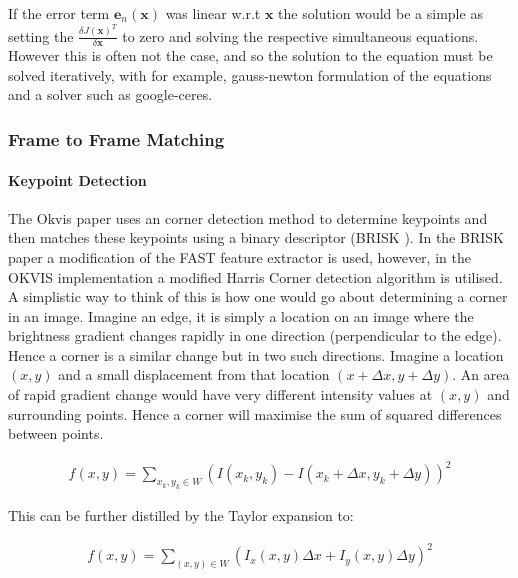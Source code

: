\documentclass[a4paper,11pt,notitlepage]{article}
\begin{document}
If the error term $\mathbf{e}_{n}(\mathbf{x})$ was linear w.r.t $\mathbf{x}$ the solution would be a simple as setting the $\frac{\delta J(\mathbf{x})^{T}}{\delta \mathbf{x}}$ to zero and solving the respective simultaneous equations. However this is often not the case, and so the solution to the equation must be solved iteratively, with for example, gauss-newton formulation of the equations and a solver such as google-ceres.

\subsubsection{Frame to Frame Matching}\label{BRISK_section}

\paragraph{Keypoint Detection}

The Okvis \cite{Okvis_1} paper uses an corner detection method to determine keypoints and then matches these keypoints using a binary descriptor (BRISK \cite{BRISK}). In the BRISK paper a modification of the FAST feature extractor is used, however, in the OKVIS implementation a modified Harris Corner detection algorithm is utilised. A simplistic way to think of this is how one would go about determining a corner in an image. Imagine an edge, it is simply a location on an image where the brightness gradient changes rapidly in one direction (perpendicular to the edge). Hence a corner is a similar change but in two such directions. Imagine a location $(x,y)$ and a small displacement from that location $(x+ \Delta x, y + \Delta y)$. An area of rapid gradient change would have very different intensity values at $(x,y)$ and surrounding points. Hence a corner will maximise the sum of squared differences between points.

\begin{equation}
\begin{aligned}
f(x,y) = \sum_{x_{k},y_{k} \in W} (I(x_{k},y_{k}) - I(x_{k} + \Delta x,y_{k} + \Delta y))^{2}
\end{aligned}
\end{equation}

This can be further distilled by the Taylor expansion to:

\begin{equation}
\begin{aligned}
f(x,y) = \sum_{(x,y)\in W} (I_{x}(x,y) \Delta x + I_{y}(x,y) \Delta y )^{2}
\end{aligned}
\end{equation}
\end{document}
